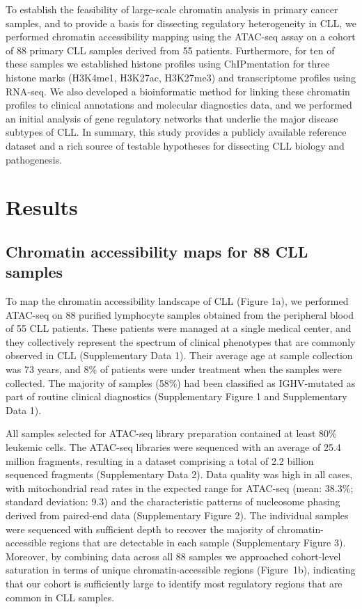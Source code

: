 \documentclass[10pt,]{article}
\begin{document}
To establish the feasibility of large-scale chromatin analysis in
primary cancer samples, and to provide a basis for dissecting regulatory
heterogeneity in CLL, we performed chromatin accessibility mapping using
the ATAC-seq assay on a cohort of 88 primary CLL samples derived from 55
patients. Furthermore, for ten of these samples we established histone
profiles using ChIPmentation for three histone marks (H3K4me1, H3K27ac,
H3K27me3) and transcriptome profiles using RNA-seq. We also developed a
bioinformatic method for linking these chromatin profiles to clinical
annotations and molecular diagnostics data, and we performed an initial
analysis of gene regulatory networks that underlie the major disease
subtypes of CLL. In summary, this study provides a publicly available
reference dataset and a rich source of testable hypotheses for
dissecting CLL biology and pathogenesis.

\section{Results}\label{results}

\subsection{Chromatin accessibility maps for 88 CLL
samples}\label{chromatin-accessibility-maps-for-88-cll-samples}

To map the chromatin accessibility landscape of CLL (Figure 1a), we
performed ATAC-seq on 88 purified lymphocyte samples obtained from the
peripheral blood of 55 CLL patients. These patients were managed at a
single medical center, and they collectively represent the spectrum of
clinical phenotypes that are commonly observed in CLL (Supplementary
Data 1). Their average age at sample collection was 73 years, and 8\% of
patients were under treatment when the samples were collected. The
majority of samples (58\%) had been classified as IGHV-mutated as part
of routine clinical diagnostics (Supplementary Figure 1 and
Supplementary Data 1).

All samples selected for ATAC-seq library preparation contained at least
80\% leukemic cells. The ATAC-seq libraries were sequenced with an
average of 25.4 million fragments, resulting in a dataset comprising a
total of 2.2 billion sequenced fragments (Supplementary Data 2). Data
quality was high in all cases, with mitochondrial read rates in the
expected range for ATAC-seq (mean: 38.3\%; standard deviation: 9.3) and
the characteristic patterns of nucleosome phasing derived from
paired-end data (Supplementary Figure 2). The individual samples were
sequenced with sufficient depth to recover the majority of
chromatin-accessible regions that are detectable in each sample
(Supplementary Figure 3). Moreover, by combining data across all 88
samples we approached cohort-level saturation in terms of unique
chromatin-accessible regions (Figure~1b), indicating that our cohort is
sufficiently large to identify most regulatory regions that are common
in CLL samples.
\end{document}
